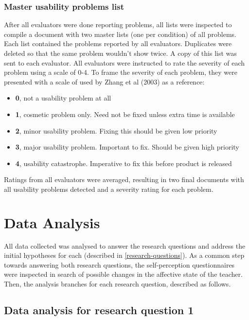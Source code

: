 \subsubsection{Master usability problems list}
After all evaluators were done reporting problems, all lists were inspected to compile a document with two master lists (one per condition) of all problems. Each list contained the problems reported by all evaluators. Duplicates were deleted so that the same problem wouldn't show twice. A copy of this list was sent to each evaluator.
All evaluators were instructed to rate the severity of each problem using a scale of 0-4. To frame the severity of each problem, they were presented with a scale of used by Zhang et al (2003) \cite{zhang_johnson_patel_paige_kubose_2003} as a reference:
\begin{itemize}
    \item \textbf{0}, not a usability problem at all
    \item \textbf{1}, cosmetic problem only. Need not be fixed unless extra time is available
    \item \textbf{2}, minor usability problem. Fixing this should be given low priority
    \item \textbf{3}, major usability problem. Important to fix. Should be given high priority
    \item \textbf{4}, usability catastrophe. Imperative to fix this before product is released
\end{itemize}
Ratings from all evaluators were averaged, resulting in two final documents with all usability problems detected and a severity rating for each problem.
\section{Data Analysis} \label{data-analysis}
All data collected was analysed to answer the research questions and address the initial hypotheses for each (described in \ref{research-questions}). As a common step towards answering both research questions, the self-perception questionnaires were inspected in search of possible changes in the affective state of the teacher. Then, the analysis branches for each research question, described as follows.
\subsection{Data analysis for research question 1}
